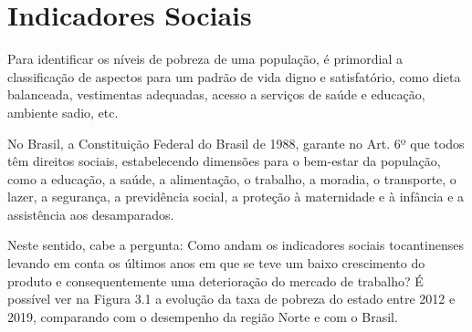 \chapter{Indicadores Sociais}
\par Para identificar os níveis de pobreza de uma população, é primordial a classificação de aspectos para um padrão de vida digno e satisfatório, como dieta balanceada, vestimentas adequadas, acesso a serviços de saúde e educação, ambiente sadio, etc.
\par No Brasil, a Constituição Federal do Brasil de 1988, garante no Art. 6º que todos têm direitos sociais, estabelecendo dimensões para o bem-estar da população, como a educação, a saúde, a alimentação, o trabalho, a moradia, o transporte, o lazer, a segurança, a previdência social, a proteção à maternidade e à infância e a assistência aos desamparados.
\par Neste sentido, cabe a pergunta: Como andam os indicadores sociais tocantinenses levando em conta os últimos anos em que se teve um baixo crescimento do produto e consequentemente uma deterioração do mercado de trabalho? É possível ver na Figura 3.1 a evolução da taxa de pobreza do estado entre 2012 e 2019, comparando com o desempenho da região Norte e com o Brasil.
